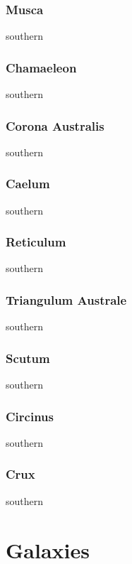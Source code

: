\subsubsection{Musca}
southern
\subsubsection{Chamaeleon}
southern
\subsubsection{Corona Australis}
southern
\subsubsection{Caelum}
southern
\subsubsection{Reticulum}
southern
\subsubsection{Triangulum Australe}
southern
\subsubsection{Scutum}
southern
\subsubsection{Circinus}
southern
\subsubsection{Crux}
southern

\section{Galaxies}

